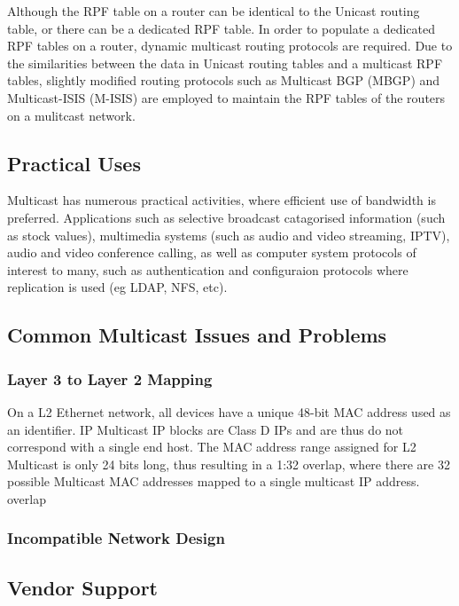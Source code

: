 Although the RPF table on a router can be identical to the Unicast
routing table, or there can be a dedicated RPF table. In order to 
populate a dedicated RPF tables on a router, dynamic multicast 
routing protocols are required. Due to the similarities between the data
in Unicast routing tables and a multicast RPF tables, slightly modified
routing protocols such as Multicast BGP (MBGP) and Multicast-ISIS
(M-ISIS) are employed to maintain the RPF tables of the routers on a
mulitcast network.

\subsection{Practical Uses}

Multicast has numerous practical activities, where efficient use of
bandwidth is preferred. Applications such as selective broadcast
catagorised information (such as stock values), multimedia systems (such
as audio and video streaming, IPTV), audio and video conference calling, 
as well as computer system protocols of interest to many, such as
authentication and configuraion protocols where replication is
used (eg LDAP, NFS, etc).

\subsection{Common Multicast Issues and Problems}

\subsubsection{Layer 3 to Layer 2 Mapping}

On a L2 Ethernet network, all devices have a unique 48-bit MAC address
used as an identifier. IP Multicast IP blocks are Class D IPs and are 
thus do not correspond with a single end host. The MAC address range
assigned for L2 Multicast is only 24 bits long, thus resulting in a 1:32
overlap, where there are 32 possible Multicast MAC addresses mapped to a 
single multicast IP address.
overlap

\subsubsection{Incompatible Network Design}


\subsection{Vendor Support}

